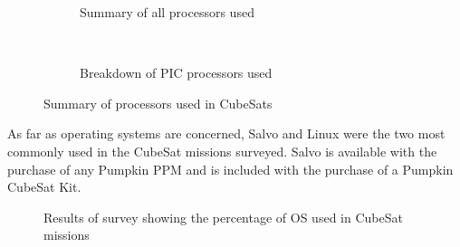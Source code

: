 \documentclass[11pt]{article}
\begin{document}
\begin{figure}[h!]
    \centering
    \begin{subfigure}[t]{0.5\textwidth}
        \centering
        \caption{Summary of all processors used}
    \end{subfigure}%
    ~ 
    \begin{subfigure}[t]{0.5\textwidth}
        \centering
        \caption{Breakdown of PIC processors used}
    \end{subfigure}
    \caption{Summary of processors used in CubeSats}
		\label{processors}
\end{figure}

As far as operating systems are concerned, Salvo and Linux were the two most commonly used in the CubeSat missions surveyed.  Salvo is available with the purchase of any Pumpkin PPM and is included with the purchase of a Pumpkin CubeSat Kit.

\begin{figure}[ht!]
\centering
{}
\caption{Results of survey showing the percentage of OS used in CubeSat missions}
\label{OS}
\end{figure}
\end{document}
